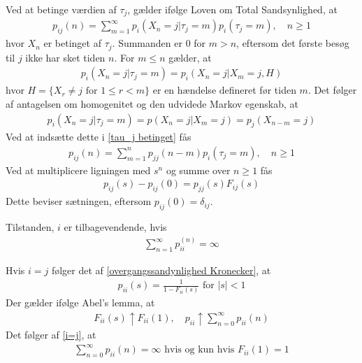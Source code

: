 \begin{bev} %
Ved at betinge værdien af $\tau_j$,
gælder ifølge Loven om Total Sandsynlighed, at
\begin{align}\label{tau_j betinget}
    p_{ij}(n)=\sum_{m=1}^\infty p_i(X_n=j|\tau_j=m)p_i(\tau_j=m), \quad n\geq 1
\end{align}
hvor $X_n$ er betinget af $\tau_j$.
Summanden er $0$ for $m>n$, eftersom det første besøg til $j$ ikke har sket tiden $n$. For $m\leq n$ gælder, at
\begin{align*}
    p_i(X_n=j|\tau_j=m)=p_i(X_n=j|X_m=j, H)
\end{align*}
hvor $H=\{X_r\neq j \text{ for } 1\leq r <m\}$ er en hændelse defineret før tiden $m$.
Det følger af antagelsen om homogenitet og den udvidede Markov egenskab, at
\begin{align*}
    p_i(X_n=j|\tau_j=m)=p(X_n=j|X_m=j)=p_j(X_{n-m}=j)
\end{align*}
Ved at indsætte dette i \eqref{tau_j betinget} fås
\begin{align*}
    p_{ij}(n)=\sum_{m=1}^n p_{jj}(n-m)p_i(\tau_j=m), \quad n\geq 1
\end{align*}
Ved at multiplicere ligningen med $s^n$ og summe over $n\geq 1$ fås
\begin{align*}
    p_{ij}(s)-p_{ij}(0)=p_{jj}(s)F_{ij}(s)
\end{align*}
Dette beviser sætningen, eftersom $p_{ij}(0)=\delta_{ij}$.
\end{bev}

\begin{minipage}\textwidth
\begin{thmx}\label{tilbagevendende} \textbf{} %
\newline
Tilstanden, $i$ er tilbagevendende, hvis
\begin{align*}
 \sum_{n=1}^\infty p_{ii}^{(n)}=\infty
\end{align*}
\end{thmx}
\end{minipage}
\begin{bev}
Hvis $i=j$ følger det af \eqref{overgangssandynlighed Kronecker}, at
\begin{align}\label{i=j}
    p_{ii}(s)=\frac{1}{1-F_{ii}(s)} \text{ for } |s|<1
\end{align}
Der gælder ifølge Abel's lemma, at
\begin{align*}
    F_{ii}(s)\uparrow F_{ii}(1), \quad p_{ii}\uparrow\sum_{n=0}^\infty p_{ii}(n)
\end{align*}
Det følger af \eqref{i=j}, at
\begin{align*}
    \sum_{n=0}^\infty p_{ii}(n)=\infty \text{ hvis og kun hvis } F_{ii}(1)=1
\end{align*}

\end{bev}


